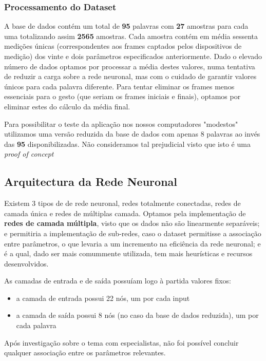 \documentclass[10pt,a4paper]{article}
\begin{document}
\subsubsection{Processamento do Dataset}

A base de dados contém um total de \textbf{95} palavras com \textbf{27} amostras para cada uma totalizando assim \textbf{2565} amostras.
Cada amostra contém em média sessenta medições únicas (correspondentes aos frames captados pelos dispositivos de medição) dos vinte e dois parâmetros especificados anteriormente.
Dado o elevado número de dados optamos por processar a média destes valores, numa tentativa de reduzir a carga sobre a rede neuronal, mas com o cuidado de garantir valores únicos para cada palavra diferente. Para tentar eliminar os frames menos essenciais para o gesto (que seriam os frames iniciais e finais), optamos por eliminar estes do cálculo da média final.

Para possibilitar o teste da aplicação nos nossos computadores "modestos" utilizamos uma versão reduzida da base de dados com apenas 8 palavras ao invés das \textbf{95} disponibilizadas. Não consideramos tal prejudicial visto que isto é uma \textit{proof of concept}

\subsection{Arquitectura da Rede Neuronal}

Existem 3 tipos de de rede neuronal, redes totalmente conectadas, redes de camada única e redes de múltiplas camada.
Optamos pela implementação de \textbf{redes de camada múltipla}, visto que os dados não são linearmente separáveis; e permitiria a implementação de sub-redes, caso o dataset permitisse a associação entre parâmetros, o que levaria a um incremento na eficiência da rede neuronal; e é a qual, dado ser mais comummente utilizada, tem mais heurísticas e recursos desenvolvidos.

As camadas de entrada e de saída possuíam logo à partida valores fixos:
\begin{itemize}
\item a camada de entrada possui 22 nós, um por cada input
\item a camada de saída possui 8 nós (no caso da base de dados reduzida), um por cada palavra
\end{itemize}

Após investigação sobre o tema com especialistas, não foi possível concluir qualquer associação entre os parâmetros relevantes.
\end{document}
